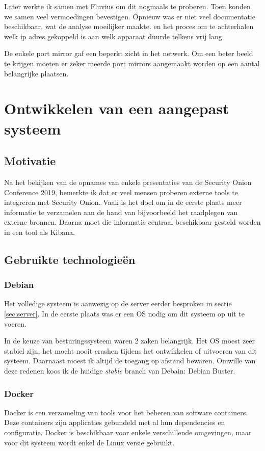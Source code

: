 \documentclass[a4paper,12pt]{report}
\begin{document}
Later werkte ik samen met Fluvius om dit nogmaals te proberen.
Toen konden we samen veel vermoedingen bevestigen.
Opnieuw was er niet veel documentatie beschikbaar, wat de analyse moeilijker maakte.
en het proces om te achterhalen welk ip adres gekoppeld is aan welk apparaat duurde telkens vrij lang.

De enkele port mirror gaf een beperkt zicht in het netwerk.
Om een beter beeld te krijgen moeten er zeker meerde port mirrors aangemaakt worden op een aantal belangrijke plaatsen.

\chapter{Ontwikkelen van een aangepast systeem}
\label{sec:aangepast-systeem}
\section{Motivatie}
Na het bekijken van de opnames van enkele presentaties van de Security Onion Conference 2019, bemerkte ik dat er veel mensen proberen externe tools te integreren met Security Onion.
\autocite{so:conference-2019}
Vaak is het doel om in de eerste plaats meer informatie te verzamelen aan de hand van bijvoorbeeld het raadplegen van externe bronnen.
Daarna moet die informatie centraal beschikbaar gesteld worden in een tool als Kibana.

\section{Gebruikte technologie\"en}
\subsection{Debian}
Het volledige systeem is aanwezig op de server eerder besproken in sectie \ref{sec:server}.
In de eerste plaats was er een OS nodig om dit systeem op uit te voeren.

In de keuze van besturingssysteem waren 2 zaken belangrijk.
Het OS moest zeer stabiel zijn, het mocht nooit crashen tijdens het ontwikkelen of uitvoeren van dit systeem.
Daarnaast moest ik altijd de toegang op afstand bewaren.
Omwille van deze redenen koos ik de huidige \emph{stable} branch van Debain: Debian Buster.

\subsection{Docker}
Docker is een verzameling van tools voor het beheren van software containers.
Deze containers zijn applicaties gebundeld met al hun dependencies en configuratie.
Docker is beschikbaar voor enkele verschillende omgevingen, maar voor dit systeem wordt enkel de Linux versie gebruikt.
\end{document}
